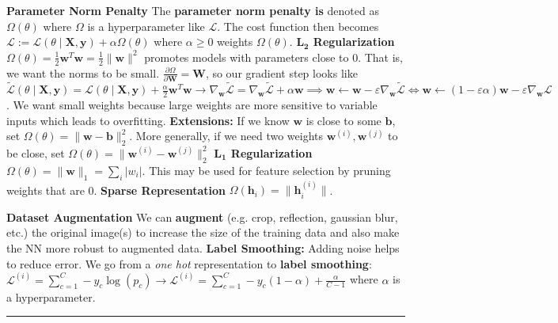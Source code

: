 \documentclass{article}
\newcommand{\X}{\bf{X}}
\newcommand{\w}{\bf{w}}
\newcommand{\y}{\bf{y}}
\newcommand{\h}{\bf{h}}
\renewcommand{\b}{\bf{b}}
\newcommand{\W}{\bf{W}}
\newcommand{\ot}{\leftarrow}
\renewcommand{\bf}[1]{\textbf{{#1}}}
\renewcommand{\it}[1]{\textit{{#1}}}
\newcommand{\pd}[2]{\frac{\partial{#1}}{\partial{#2}}}
\newcommand{\grad}[2]{\nabla_{#1}{#2}}
\newcommand{\eps}{\varepsilon}
\renewcommand{\L}{\mathcal{L}}
\begin{document}
\begin{small}
\bf{Parameter Norm Penalty}
\newline
The \bf{parameter norm penalty is} denoted as $\Omega(\theta)$ where $\Omega$ is a hyperparameter
like $\L$. The cost function then becomes 
$\L := \L(\theta \mid \X, \y) + \alpha \Omega(\theta)$ where $\alpha \geq 0$ weights
$\Omega(\theta)$.
\newline
\bf{$\bm{L_2}$ Regularization}
\newline
$\Omega(\theta) = \frac{1}{2} \w^T \w = \frac{1}{2} \|\w\|^2$ promotes models with parameters close
to 0. That is, we want the norms to be small. $\pd{\Omega}{\W} = \W$, so our gradient step looks
like 
$
\widetilde{\L}(\theta \mid \X, \y) 
= \L(\theta \mid \X, \y) + \frac{\alpha}{2} \w^T \w
\to \grad{\w}{\widetilde{\L}} = \grad{\w}{\widetilde{\L}} + \alpha \w
\implies \w \ot \w - \eps \grad{\w}{\widetilde{\L}} 
\iff \w \ot (1 - \eps \alpha) \w - \eps \grad{\w}{\L}
$. We want small weights because large weights are more sensitive to variable inputs which leads to
overfitting.
\newline
\bf{Extensions:} If we know $\w$ is close to some $\b$, set $\Omega(\theta) = \|\w - \b\|_2^2$. More
generally, if we need two weights $\w^{(i)}, \w^{(j)}$ to be close, set 
$\Omega(\theta) = \|\w^{(i)} - \w^{(j)}\|_2^2$
\newline
\bf{$\bm{L_1}$ Regularization}
\newline
$\Omega(\theta) = \|\w\|_1 = \sum_{i} |w_i|$. This may be used for feature selection by pruning
weights that are 0.
\newline
\bf{Sparse Representation}
\newline
$\Omega(\h_i) = \|\h_i^{(i)}\|$.

\newpage
\bf{Dataset Augmentation}
\newline
We can \bf{augment} (e.g. crop, reflection, gaussian blur, etc.) the original image(s) to increase 
the size of the training data and also make the NN more robust to augmented data. 
\newline
\bf{Label Smoothing:} Adding noise helps to reduce error. We go from a \it{one hot} representation to 
\bf{label smoothing}:
$\L^{(i)} = \sum_{c = 1}^{C} -y_c \log(p_c) 
\to \L^{(i)} = \sum_{c = 1}^{C} -y_c(1 - \alpha) + \frac{\alpha}{C - 1}$ where $\alpha$ is a
hyperparameter.
\hrule
\vspace{0.1em}


\end{small}
\end{document}
